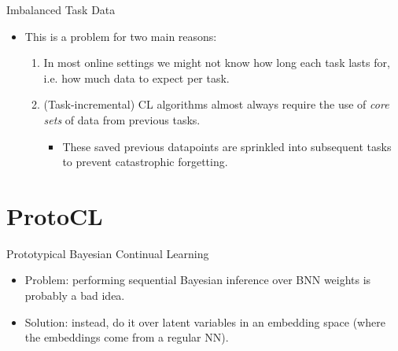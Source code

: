 \documentclass[12pt,aspectratio=169, handout]{beamer}
\let\olditem\item
\renewcommand\item{\olditem\justifying}
\begin{document}
\begin{frame}{Imbalanced Task Data}
     \begin{itemize}[<+->]
        \item This is a problem for two main reasons:
        \begin{enumerate}
            \item In most online settings we might not know how long each task lasts for, i.e. how much data to expect per task.
            \item (Task-incremental) CL algorithms almost always require the use of \textit{core sets} of data from previous tasks.
            \begin{itemize}
                \item These saved previous datapoints are sprinkled into subsequent tasks to prevent catastrophic forgetting.
            \end{itemize}
        \end{enumerate} 
    \end{itemize}

\end{frame}

\section{ProtoCL}
\begin{frame}{Prototypical Bayesian Continual Learning}
\begin{itemize}[<+->]
    \item \alert{Problem}: performing sequential Bayesian inference over BNN weights is probably a bad idea.
    \item \alert{Solution}: instead, do it over latent variables in an embedding space (where the embeddings come from a regular NN).
\end{itemize}
    
\end{frame}
\end{document}
